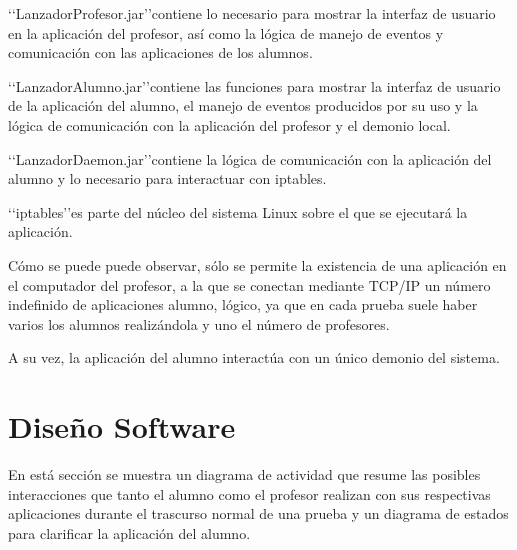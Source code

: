 \lq\lq LanzadorProfesor.jar\rq\rq contiene lo necesario para mostrar la interfaz de usuario en la aplicación del profesor, así como la lógica de manejo de eventos y comunicación con las aplicaciones de los alumnos.

\lq\lq LanzadorAlumno.jar\rq\rq contiene las funciones para mostrar la interfaz de usuario de la aplicación del alumno, el manejo de eventos producidos por su uso y la lógica de comunicación con la aplicación del profesor y el demonio local.

\lq\lq LanzadorDaemon.jar\rq\rq contiene la lógica de comunicación con la aplicación del alumno y lo necesario para interactuar con iptables.

\lq\lq iptables\rq\rq es parte del núcleo del sistema Linux sobre el que se ejecutará la aplicación.

Cómo se puede puede observar, sólo se permite la existencia de una aplicación en el computador del profesor, a la que se conectan mediante TCP/IP un número indefinido de aplicaciones alumno, lógico, ya que en cada prueba suele haber varios los alumnos realizándola y uno el número de profesores.
\newline

A su vez, la aplicación del alumno interactúa con un único demonio del sistema.


\section{Diseño Software}
\label{sec:arquitectura:diseno}

En está sección se muestra un diagrama de actividad que resume las posibles interacciones que tanto el alumno como el profesor realizan con sus respectivas aplicaciones durante el trascurso normal de una prueba y un diagrama de estados para clarificar la aplicación del alumno.
\newline


